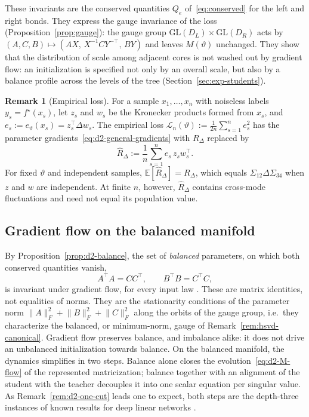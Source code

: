 \documentclass[11pt]{article}
\newcommand{\E}{\mathbb{E}}
\newcommand{\GL}{\mathrm{GL}}
\newcommand{\norm}[1]{\lVert #1\rVert}
\theoremstyle{definition}
\newtheorem{remark}[theorem]{Remark}
\numberwithin{equation}{section}
\begin{document}
These invariants are the conserved quantities $Q_e$ of~\eqref{eq:conserved} for the left and right bonds. They express the gauge invariance of the loss (Proposition~\ref{prop:gauge}): the gauge group $\GL(D_L)\times\GL(D_R)$ acts by $(A,C,B)\mapsto(AX,\,X^{-1}CY^{-\top},\,BY)$ and leaves $M(\vartheta)$ unchanged. They show that the distribution of scale among adjacent cores is not washed out by gradient flow: an initialization is specified not only by an overall scale, but also by a balance profile across the levels of the tree (Section~\ref{sec:exp-students}).

\begin{remark}[Empirical loss]\label{rem:d2-empirical}
For a sample $x_1,\dots,x_n$ with noiseless labels $y_s=f^\star(x_s)$, let $z_s$ and $w_s$ be the Kronecker products formed from $x_s$, and $e_s:=e_\vartheta(x_s)=z_s^\top\Delta w_s$. The empirical loss $\mathcal L_n(\vartheta):=\frac1{2n}\sum_{s=1}^ne_s^2$ has the parameter gradients~\eqref{eq:d2-general-gradients} with $R_\Delta$ replaced by
\[
\widehat R_\Delta:=\frac1n\sum_{s=1}^ne_s\,z_sw_s^\top.
\]
For fixed $\vartheta$ and independent samples, $\E[\widehat R_\Delta]=R_\Delta$, which equals $\Sigma_{12}\Delta\Sigma_{34}$ when $z$ and $w$ are independent. At finite $n$, however, $\widehat R_\Delta$ contains cross-mode fluctuations and need not equal its population value.
\end{remark}

\subsection{Gradient flow on the balanced manifold}\label{sec:d2-balanced}

By Proposition~\ref{prop:d2-balance}, the set of \emph{balanced} parameters, on which both conserved quantities vanish,
\begin{equation}\label{eq:d2-balanced}
A^\top A=CC^\top,\qquad B^\top B=C^\top C,
\end{equation}
is invariant under gradient flow, for every input law \citep[cf.][]{du2018algorithmic}. These are matrix identities, not equalities of norms. They are the stationarity conditions of the parameter norm $\norm{A}_F^2+\norm{B}_F^2+\norm{C}_F^2$ along the orbits of the gauge group, i.e.\ they characterize the balanced, or minimum-norm, gauge of Remark~\ref{rem:hsvd-canonical}. Gradient flow preserves balance, and imbalance alike: it does not drive an unbalanced initialization towards balance. On the balanced manifold, the dynamics simplifies in two steps. Balance alone closes the evolution~\eqref{eq:d2-M-flow} of the represented matricization; balance together with an alignment of the student with the teacher decouples it into one scalar equation per singular value. As Remark~\ref{rem:d2-one-cut} leads one to expect, both steps are the depth-three instances of known results for deep linear networks \citep{saxe2014exact,arora2018optimization}.
\end{document}
